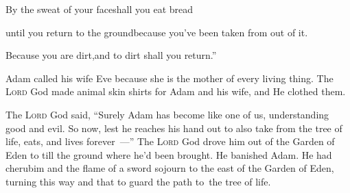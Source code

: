 \begin{inparaenum}
  \pa {} By the sweat of your face\pa shall you eat bread%
  
  \pb until you return to the ground\pa because you've been taken from out of it.%
  
  \pb Because you are dirt,\pa and to dirt shall you return.''%
  
   Adam called his wife Eve because she is the mother of every living thing.%
   The \textsc{Lord} God made animal skin shirts for Adam and his wife, and He clothed them.%
  
   The \textsc{Lord} God said, ``Surely Adam has become like one of us, understanding good and evil. So now, lest he reaches his hand out to also take from the tree of life, eats, and lives forever~---''%
   The \textsc{Lord} God drove him out of the Garden of Eden to till the ground where he'd been brought.%
   He banished Adam. He had cherubim and the flame of a sword sojourn to the east of the Garden of Eden, turning this way and that to guard the path to\understood\ the tree of life.%
\end{inparaenum}

